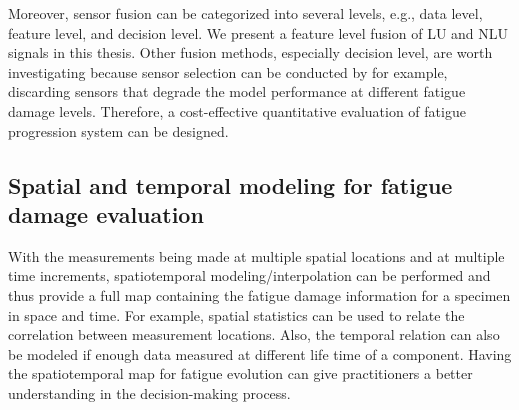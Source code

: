 Moreover, sensor fusion can be categorized into several levels, e.g., data level, feature level, and decision level. We present a feature level fusion of LU and NLU signals in this thesis. Other fusion methods, especially decision level, are worth investigating because sensor selection can be conducted by for example, discarding sensors that degrade the model performance at different fatigue damage levels. Therefore, a cost-effective quantitative evaluation of fatigue progression system can be designed.

\subsection{Spatial and temporal modeling for fatigue damage evaluation}

With the measurements being made at multiple spatial locations and at multiple time increments, spatiotemporal modeling/interpolation can be performed and thus provide a full map containing the fatigue damage information for a specimen in space and time. For example, spatial statistics can be used to relate the correlation between measurement locations. Also, the temporal relation can also be modeled if enough data measured at different life time of a component. Having the spatiotemporal map for fatigue evolution can give practitioners a better understanding in the decision-making process.